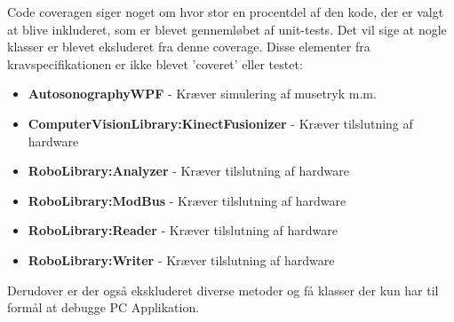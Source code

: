 Code coveragen siger noget om hvor stor en procentdel af den kode, der er valgt at blive inkluderet, som er blevet gennemløbet af unit-tests. Det vil sige at nogle klasser er blevet eksluderet fra denne coverage. Disse elementer fra kravspecifikationen er ikke blevet 'coveret' eller testet:
\begin{itemize}
\setlength\itemsep{0.25em}
\item{\textbf{AutosonographyWPF}} - Kræver simulering af musetryk m.m.
\item{\textbf{ComputerVisionLibrary:KinectFusionizer}} - Kræver tilslutning af hardware
\item{\textbf{RoboLibrary:Analyzer}} - Kræver tilslutning af hardware
\item{\textbf{RoboLibrary:ModBus}} - Kræver tilslutning af hardware
\item{\textbf{RoboLibrary:Reader}} - Kræver tilslutning af hardware
\item{\textbf{RoboLibrary:Writer}} - Kræver tilslutning af hardware
\end{itemize}

Derudover er der også ekskluderet diverse metoder og få klasser der kun har til formål at debugge PC Applikation.